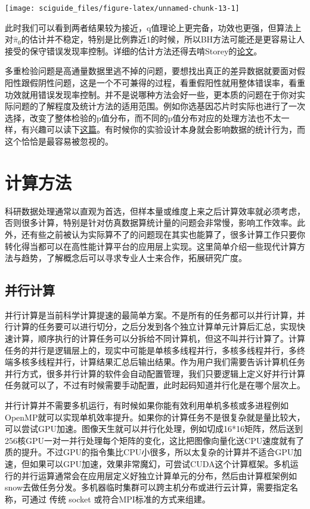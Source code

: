 \documentclass[]{tufte-book}
\begin{document}
\texttt{[image: sciguide\_files/figure-latex/unnamed-chunk-13-1]}

此时我们可以看到两者结果较为接近，q值理论上更完备，功效也更强，但算法上对\(\hat\pi_0\)的估计并不稳定，特别是比例靠近1的时候，所以BH方法可能还是更容易让人接受的保守错误发现率控制。详细的估计方法还得去啃Storey的\href{http://www.pnas.org/content/100/16/9440.full}{论文}。

多重检验问题是高通量数据里逃不掉的问题，要想找出真正的差异数据就要面对假阳性跟假阴性问题，这是一个不可兼得的过程，看重假阳性就用整体错误率，看重功效就用错误发现率控制。并不是说哪种方法会好一些，更本质的问题在于你对实际问题的了解程度及统计方法的适用范围。例如你选基因芯片时实际也进行了一次选择，改变了整体检验的p值分布，而不同的p值分布对应的处理方法也不太一样，有兴趣可以读下\href{http://varianceexplained.org/statistics/interpreting-pvalue-histogram/}{这篇}。有时候你的实验设计本身就会影响数据的统计行为，而这个恰恰是最容易被忽视的。

\hypertarget{ux8ba1ux7b97ux65b9ux6cd5}{%
\section{计算方法}\label{ux8ba1ux7b97ux65b9ux6cd5}}

科研数据处理通常以直观为首选，但样本量或维度上来之后计算效率就必须考虑，否则很多计算，特别是针对仿真数据算统计量的问题会非常慢，影响工作效率。此外，还有些之前被认为实际算不了的问题现在其实也能算了，很多计算工作只要你转化得当都可以在高性能计算平台的应用层上实现。这里简单介绍一些现代计算方法与趋势，了解概念后可以寻求专业人士来合作，拓展研究广度。

\hypertarget{ux5e76ux884cux8ba1ux7b97}{%
\subsection{并行计算}\label{ux5e76ux884cux8ba1ux7b97}}

并行计算是当前科学计算提速的最简单方案。不是所有的任务都可以并行计算，并行计算的任务要可以进行切分，之后分发到各个独立计算单元计算后汇总，实现快速计算，顺序执行的计算任务可以分拆给不同计算机，但这不叫并行计算了。计算任务的并行是逻辑层上的，现实中可能是单核多线程并行，多核多线程并行，多终端多核多线程并行，计算结果汇总后输出结果。作为用户我们需要告诉计算机任务并行方式，很多并行计算的软件会自动配置管理，我们只要逻辑上定义好并行计算任务就可以了，不过有时候需要手动配置，此时起码知道并行化是在哪个层次上。

并行计算并不需要多机运行，有时候如果你能有效利用单机多核或多进程例如OpenMP就可以实现单机效率提升。如果你的计算任务不是很复杂就是量比较大，可以尝试GPU加速。图像天生就可以并行化处理，例如切成16*16矩阵，然后送到256核GPU一对一并行处理每个矩阵的变化，这比把图像向量化送CPU速度就有了质的提升。不过GPU的指令集比CPU小很多，所以太复杂的计算并不适合GPU加速，但如果可以GPU加速，效果非常魔幻，可尝试CUDA这个计算框架。多机运行的并行运算通常会在应用层定义好独立计算单元的分布，然后由计算框架例如snow去做任务分发。多机器临时集群可以跨主机分布或进行云计算，需要指定名称，可通过 传统 socket 或符合MPI标准的方式来组建。
\end{document}
